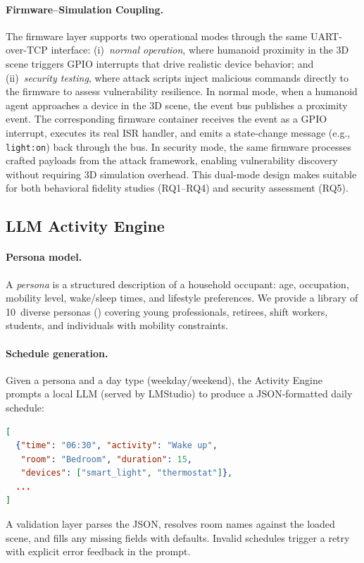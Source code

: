 \paragraph{Firmware--Simulation Coupling.}
The firmware layer supports two operational modes through the same
UART-over-TCP interface:
(i)~\emph{normal operation}, where humanoid proximity in the 3D
scene triggers GPIO interrupts that drive realistic device behavior;
and
(ii)~\emph{security testing}, where attack scripts inject malicious
commands directly to the firmware to assess vulnerability resilience.
In normal mode, when a humanoid agent approaches a device in the 3D
scene, the event bus publishes a proximity event.  The corresponding
firmware container receives the event as a GPIO interrupt, executes
its real ISR handler, and emits a state-change message
(e.g., \texttt{light:on}) back through the bus.  In security mode,
the same firmware processes crafted payloads from the attack
framework, enabling vulnerability discovery without requiring
3D simulation overhead.  This dual-mode design makes \sys{} suitable
for both behavioral fidelity studies (RQ1--RQ4) and security
assessment (RQ5).

\subsection{LLM Activity Engine}

\paragraph{Persona model.}
A \emph{persona} is a structured description of a household occupant:
age, occupation, mobility level, wake/sleep times, and lifestyle
preferences.  We provide a library of 10~diverse personas
() covering young professionals, retirees, shift
workers, students, and individuals with mobility constraints.



\paragraph{Schedule generation.}
Given a persona and a day type (weekday/weekend), the Activity Engine
prompts a local LLM (served by LMStudio) to produce a JSON-formatted
daily schedule:
\begin{lstlisting}[language=json,basicstyle=\ttfamily\footnotesize]
[
  {"time": "06:30", "activity": "Wake up",
   "room": "Bedroom", "duration": 15,
   "devices": ["smart_light", "thermostat"]},
  ...
]
\end{lstlisting}
A validation layer parses the JSON, resolves room names against the
loaded scene, and fills any missing fields with defaults.  Invalid
schedules trigger a retry with explicit error feedback in the prompt.

